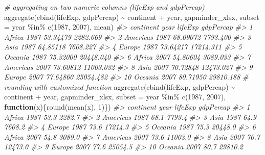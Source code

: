 \documentclass[
]{book}
\newenvironment{Shaded}{\begin{snugshade}}{\end{snugshade}}
\newcommand{\AttributeTok}[1]{\textcolor[rgb]{0.77,0.63,0.00}{#1}}
\newcommand{\CommentTok}[1]{\textcolor[rgb]{0.56,0.35,0.01}{\textit{#1}}}
\newcommand{\ControlFlowTok}[1]{\textcolor[rgb]{0.13,0.29,0.53}{\textbf{#1}}}
\newcommand{\DecValTok}[1]{\textcolor[rgb]{0.00,0.00,0.81}{#1}}
\newcommand{\FunctionTok}[1]{\textcolor[rgb]{0.00,0.00,0.00}{#1}}
\newcommand{\NormalTok}[1]{#1}
\newcommand{\SpecialCharTok}[1]{\textcolor[rgb]{0.00,0.00,0.00}{#1}}
\begin{document}
\begin{Shaded}
\begin{Highlighting}[]
\CommentTok{\# aggregating on two numeric columns (lifeExp and gdpPercap)}
\FunctionTok{aggregate}\NormalTok{(}\FunctionTok{cbind}\NormalTok{(lifeExp, gdpPercap) }\SpecialCharTok{\textasciitilde{}}\NormalTok{ continent }\SpecialCharTok{+}\NormalTok{ year, }
\NormalTok{          gapminder\_xlsx, }
          \AttributeTok{subset =}\NormalTok{ year }\SpecialCharTok{\%in\%} \FunctionTok{c}\NormalTok{(}\DecValTok{1987}\NormalTok{, }\DecValTok{2007}\NormalTok{), }
\NormalTok{          mean)}
\CommentTok{\#\textgreater{}    continent year  lifeExp gdpPercap}
\CommentTok{\#\textgreater{} 1     Africa 1987 53.34479  2282.669}
\CommentTok{\#\textgreater{} 2   Americas 1987 68.09072  7793.400}
\CommentTok{\#\textgreater{} 3       Asia 1987 64.85118  7608.227}
\CommentTok{\#\textgreater{} 4     Europe 1987 73.64217 17214.311}
\CommentTok{\#\textgreater{} 5    Oceania 1987 75.32000 20448.040}
\CommentTok{\#\textgreater{} 6     Africa 2007 54.80604  3089.033}
\CommentTok{\#\textgreater{} 7   Americas 2007 73.60812 11003.032}
\CommentTok{\#\textgreater{} 8       Asia 2007 70.72848 12473.027}
\CommentTok{\#\textgreater{} 9     Europe 2007 77.64860 25054.482}
\CommentTok{\#\textgreater{} 10   Oceania 2007 80.71950 29810.188}
\CommentTok{\# rounding with customized function}
\FunctionTok{aggregate}\NormalTok{(}\FunctionTok{cbind}\NormalTok{(lifeExp, gdpPercap) }\SpecialCharTok{\textasciitilde{}}\NormalTok{ continent }\SpecialCharTok{+}\NormalTok{ year, }
\NormalTok{          gapminder\_xlsx, }
          \AttributeTok{subset =}\NormalTok{ year }\SpecialCharTok{\%in\%} \FunctionTok{c}\NormalTok{(}\DecValTok{1987}\NormalTok{, }\DecValTok{2007}\NormalTok{), }
          \ControlFlowTok{function}\NormalTok{(x)\{}\FunctionTok{round}\NormalTok{(}\FunctionTok{mean}\NormalTok{(x), }\DecValTok{1}\NormalTok{)\})}
\CommentTok{\#\textgreater{}    continent year lifeExp gdpPercap}
\CommentTok{\#\textgreater{} 1     Africa 1987    53.3    2282.7}
\CommentTok{\#\textgreater{} 2   Americas 1987    68.1    7793.4}
\CommentTok{\#\textgreater{} 3       Asia 1987    64.9    7608.2}
\CommentTok{\#\textgreater{} 4     Europe 1987    73.6   17214.3}
\CommentTok{\#\textgreater{} 5    Oceania 1987    75.3   20448.0}
\CommentTok{\#\textgreater{} 6     Africa 2007    54.8    3089.0}
\CommentTok{\#\textgreater{} 7   Americas 2007    73.6   11003.0}
\CommentTok{\#\textgreater{} 8       Asia 2007    70.7   12473.0}
\CommentTok{\#\textgreater{} 9     Europe 2007    77.6   25054.5}
\CommentTok{\#\textgreater{} 10   Oceania 2007    80.7   29810.2}
\end{Highlighting}
\end{Shaded}
\end{document}
